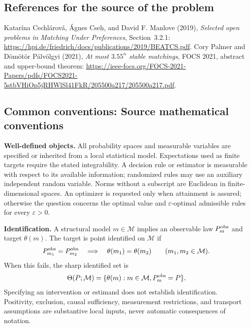 \documentclass[11pt,a4paper]{article}
\begin{document}
\subsection*{References for the source of the problem}
Katar\'ina Cechl\'arov\'a, \'Agnes Cseh, and David F. Manlove (2019), \emph{Selected open problems in Matching Under Preferences}, Section~3.2.1: \url{https://hpi.de/friedrich/docs/publications/2019/BEATCS.pdf}. Cory Palmer and D\"om\"ot\"or P\'alv\"olgyi (2021), \emph{At most $3.55^n$ stable matchings}, FOCS 2021, abstract and upper-bound theorem: \url{https://ieee-focs.org/FOCS-2021-Papers/pdfs/FOCS2021-5stbVHiOp5jRHWlSl41FkR/205500a217/205500a217.pdf}.

\subsection*{Common conventions: Source mathematical conventions}

\textbf{Well-defined objects.}
All probability spaces and measurable variables are specified or inherited
from a local statistical model. Expectations used as finite targets require
the stated integrability. A decision rule or estimator is measurable with
respect to its available information; randomized rules may use an auxiliary
independent random variable. Norms without a subscript are Euclidean in
finite-dimensional spaces. An optimizer is requested only when attainment
is assured; otherwise the question concerns the optimal value and
$\varepsilon$-optimal admissible rules for every $\varepsilon>0$.

\textbf{Identification.}
A structural model $m\in\mathcal M$ implies an observable law
$P_m^{\rm obs}$ and target $\theta(m)$. The target is point identified on
$\mathcal M$ if
\[
 P_{m_1}^{\rm obs}=P_{m_2}^{\rm obs}
 \quad\Longrightarrow\quad\theta(m_1)=\theta(m_2)
 \qquad(m_1,m_2\in\mathcal M).
\]
When this fails, the sharp identified set is
\[
 \Theta(P;\mathcal M)=\{\theta(m):m\in\mathcal M,
                                  P_m^{\rm obs}=P\}.
\]
Specifying an intervention or estimand does not establish identification.
Positivity, exclusion, causal sufficiency, measurement restrictions, and
transport assumptions are substantive local inputs, never automatic
consequences of notation.
\end{document}
